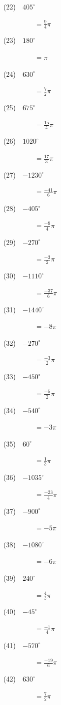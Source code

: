 \documentclass[a4j,twocolumn,10pt,fleqn]{jarticle}
\begin{document}
(22)~~$405^\circ$

~~~~~~~~~$=\frac{9}{4}\pi$

(23)~~$180^\circ$

~~~~~~~~~$=\pi$

(24)~~$630^\circ$

~~~~~~~~~$=\frac{7}{2}\pi$

(25)~~$675^\circ$

~~~~~~~~~$=\frac{15}{4}\pi$

(26)~~$1020^\circ$

~~~~~~~~~$=\frac{17}{3}\pi$

(27)~~$-1230^\circ$

~~~~~~~~~$=\frac{-41}{6}\pi$

(28)~~$-405^\circ$

~~~~~~~~~$=\frac{-9}{4}\pi$

(29)~~$-270^\circ$

~~~~~~~~~$=\frac{-3}{2}\pi$

(30)~~$-1110^\circ$

~~~~~~~~~$=\frac{-37}{6}\pi$

(31)~~$-1440^\circ$

~~~~~~~~~$=-8\pi$

(32)~~$-270^\circ$

~~~~~~~~~$=\frac{-3}{2}\pi$

(33)~~$-450^\circ$

~~~~~~~~~$=\frac{-5}{2}\pi$

(34)~~$-540^\circ$

~~~~~~~~~$=-3\pi$

(35)~~$60^\circ$

~~~~~~~~~$=\frac{1}{3}\pi$

(36)~~$-1035^\circ$

~~~~~~~~~$=\frac{-23}{4}\pi$

(37)~~$-900^\circ$

~~~~~~~~~$=-5\pi$

(38)~~$-1080^\circ$

~~~~~~~~~$=-6\pi$

(39)~~$240^\circ$

~~~~~~~~~$=\frac{4}{3}\pi$

(40)~~$-45^\circ$

~~~~~~~~~$=\frac{-1}{4}\pi$

(41)~~$-570^\circ$

~~~~~~~~~$=\frac{-19}{6}\pi$

(42)~~$630^\circ$

~~~~~~~~~$=\frac{7}{2}\pi$
\end{document}
